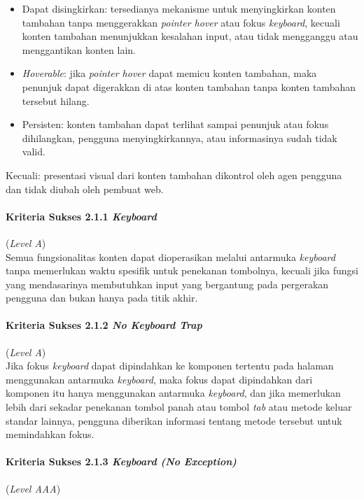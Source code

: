 \begin{itemize}
	\item Dapat disingkirkan: tersedianya mekanisme untuk menyingkirkan konten tambahan tanpa menggerakkan \textit{pointer hover} atau fokus \textit{keyboard}, kecuali konten tambahan menunjukkan kesalahan input, atau tidak mengganggu atau menggantikan konten lain.
	\item \textit{Hoverable}: jika \textit{pointer hover} dapat memicu konten tambahan, maka penunjuk dapat digerakkan di atas konten tambahan tanpa konten tambahan tersebut hilang.
	\item Persisten: konten tambahan dapat terlihat sampai penunjuk atau fokus dihilangkan, pengguna menyingkirkannya, atau informasinya sudah tidak valid.
\end{itemize}

Kecuali: presentasi visual dari konten tambahan dikontrol oleh agen pengguna dan tidak diubah oleh pembuat web.


\paragraph{Kriteria Sukses 2.1.1 \textit{Keyboard}}
\label{subsec:kriteria_2.1.1}
(\textit{Level A}) \\

Semua fungsionalitas konten dapat dioperasikan melalui antarmuka \textit{keyboard} tanpa memerlukan waktu spesifik untuk penekanan tombolnya, kecuali jika fungsi yang mendasarinya membutuhkan input yang bergantung pada pergerakan pengguna dan bukan hanya pada titik akhir.

\paragraph{Kriteria Sukses 2.1.2 \textit{No Keyboard Trap}}
\label{subsec:kriteria_2.1.2}
(\textit{Level A}) \\

Jika fokus \textit{keyboard} dapat dipindahkan ke komponen tertentu pada halaman menggunakan antarmuka \textit{keyboard}, maka fokus dapat dipindahkan dari komponen itu hanya menggunakan antarmuka \textit{keyboard}, dan jika memerlukan lebih dari sekadar penekanan tombol panah atau tombol \textit{tab} atau metode keluar standar lainnya, pengguna diberikan informasi tentang metode tersebut untuk memindahkan fokus.

\paragraph{Kriteria Sukses 2.1.3 \textit{Keyboard (No Exception)}}
\label{subsec:kriteria_2.1.3}
(\textit{Level AAA}) \\

